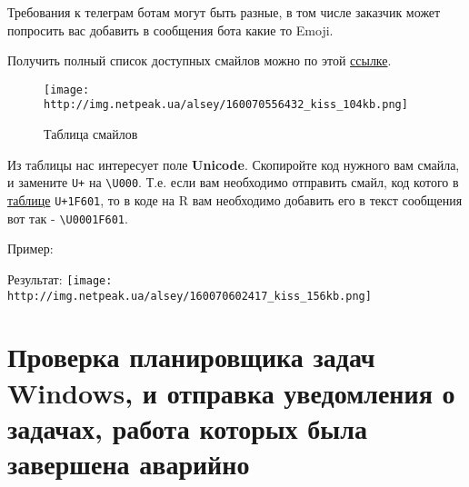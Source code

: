 \documentclass[
]{book}
\newenvironment{Shaded}{\begin{snugshade}}{\end{snugshade}}
\newcommand{\FunctionTok}[1]{\textcolor[rgb]{0.00,0.00,0.00}{#1}}
\newcommand{\NormalTok}[1]{#1}
\newcommand{\SpecialCharTok}[1]{\textcolor[rgb]{0.00,0.00,0.00}{#1}}
\newcommand{\StringTok}[1]{\textcolor[rgb]{0.31,0.60,0.02}{#1}}
\begin{document}
Требования к телеграм ботам могут быть разные, в том числе заказчик может попросить вас добавить в сообщения бота какие то Emoji.

Получить полный список доступных смайлов можно по этой \href{https://apps.timwhitlock.info/emoji/tables/unicode}{ссылке}.

\begin{figure}
\centering
\texttt{[image: http://img.netpeak.ua/alsey/160070556432\_kiss\_104kb.png]}
\caption{Таблица смайлов}
\end{figure}

Из таблицы нас интересует поле \textbf{Unicode}. Скопиройте код нужного вам смайла, и замените \texttt{U+} на \texttt{\textbackslash{}U000}. Т.е. если вам необходимо отправить смайл, код котого в \href{https://apps.timwhitlock.info/emoji/tables/unicode}{таблице} \texttt{U+1F601}, то в коде на R вам необходимо добавить его в текст сообщения вот так - \texttt{\textbackslash{}U0001F601}.

Пример:

\begin{Shaded}
\end{Shaded}

Результат:
\texttt{[image: http://img.netpeak.ua/alsey/160070602417\_kiss\_156kb.png]}

\hypertarget{ux43fux440ux43eux432ux435ux440ux43aux430-ux43fux43bux430ux43dux438ux440ux43eux432ux449ux438ux43aux430-ux437ux430ux434ux430ux447-windows-ux438-ux43eux442ux43fux440ux430ux432ux43aux430-ux443ux432ux435ux434ux43eux43cux43bux435ux43dux438ux44f-ux43e-ux437ux430ux434ux430ux447ux430ux445-ux440ux430ux431ux43eux442ux430-ux43aux43eux442ux43eux440ux44bux445-ux431ux44bux43bux430-ux437ux430ux432ux435ux440ux448ux435ux43dux430-ux430ux432ux430ux440ux438ux439ux43dux43e}{%
\section{Проверка планировщика задач Windows, и отправка уведомления о задачах, работа которых была завершена аварийно}\label{ux43fux440ux43eux432ux435ux440ux43aux430-ux43fux43bux430ux43dux438ux440ux43eux432ux449ux438ux43aux430-ux437ux430ux434ux430ux447-windows-ux438-ux43eux442ux43fux440ux430ux432ux43aux430-ux443ux432ux435ux434ux43eux43cux43bux435ux43dux438ux44f-ux43e-ux437ux430ux434ux430ux447ux430ux445-ux440ux430ux431ux43eux442ux430-ux43aux43eux442ux43eux440ux44bux445-ux431ux44bux43bux430-ux437ux430ux432ux435ux440ux448ux435ux43dux430-ux430ux432ux430ux440ux438ux439ux43dux43e}}
\end{document}
